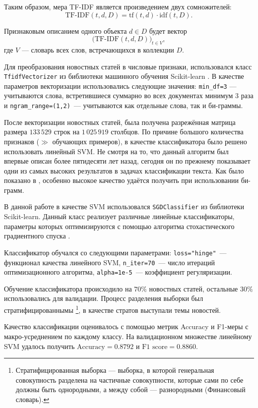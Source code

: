 \documentclass[a4paper, 14pt]{extarticle}
\begin{document}
Таким образом, мера TF-IDF является произведением двух сомножителей:
$$
\text{TF-IDF}(t, d, D) = \text{tf}(t, d) \cdot \text{idf}(t, D).
$$

Признаковым описанием одного объекта $d \in D$ будет вектор
$$
\big(\text{TF-IDF}(t,d,D)\big)_{t\in V},
$$
где $V$ --- словарь всех слов, встречающихся в коллекции $D$.

Для преобразования новостных статей в числовые признаки, использовался класс \verb+TfidfVectorizer+ из библиотеки машинного обучения Scikit-learn 
\cite{scikit-learn}. В качестве параметров векторизации использовались следующие значения: \verb+min_df=3+ --- учитываются слова, встретившиеся 
суммарно во всех документах минимум 3 раза и  \verb+ngram_range=(1,2)+~--- учитываются как отдельные слова, так и би-граммы.

После векторизации новостных статей, была получена разрежённая матрица размера $133\,529$ строк на $1\,025\,919$ столбцов. По причине большого 
количества признаков ($\gg$  обучающих примеров), в качестве классификатора было решено использовать линейный SVM. Не смотря на то, что данный 
алгоритм был впервые описан более пятидесяти лет назад, сегодня он по прежнему показывает одни из самых высоких результатов в задачах классификации 
текста. Как было показано в \cite{wang12simple}, особенно высокое качество удаётся получить при использовании би-грамм.

В данной работе в качестве SVM использовался \verb+SGDClassifier+ из библиотеки Scikit-learn. Данный класс реализует различные линейные
классификаторы, параметры которых оптимизируются с помощью алгоритма стохастического градиентного спуска \cite{Bottou2010}.

Классификатор обучался со следующими параметрами: \verb+loss="hinge"+~--- функционал качества линейного SVM,
\verb+n_iter=70+~--- число итераций оптимизационного алгоритма, \verb+alpha=1e-5+~--- коэффициент регуляризации.

Обучение классификатора происходило на $70\%$ новостных статей, остальные $30\%$ использовались для валидации.
Процесс разделения выборки был стратифицированнымы \footnote{Стратифицированная выборка --- выборка, в которой генеральная совокупность разделена на 
частичные совокупности, которые сами по себе должны быть однородными, а между собой --- разнородными (Финансовый словарь).}, в качестве
стратов выступали темы новостей.

Качество классификации оценивалось с помощью метрик Accuracy и F1-меры с макро-усреднением по каждому классу.
На валидационном множестве линейному SVM удалось получить $\text{Accuracy} = 0.8792$ и $\text{F1 score} = 0.8860$.
\end{document}
